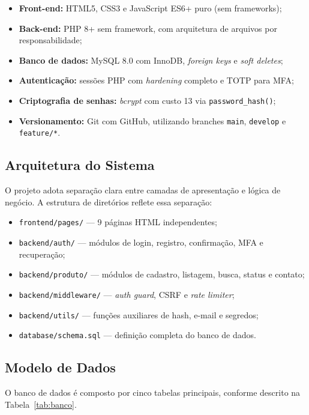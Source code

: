 \documentclass[12pt,a4paper]{article}
\begin{document}
\begin{itemize}
  \item \textbf{Front-end:} HTML5, CSS3 e JavaScript ES6+ puro (sem frameworks);
  \item \textbf{Back-end:} PHP 8+ sem framework, com arquitetura de arquivos por responsabilidade;
  \item \textbf{Banco de dados:} MySQL 8.0 com InnoDB, \textit{foreign keys} e \textit{soft deletes};
  \item \textbf{Autenticação:} sessões PHP com \textit{hardening} completo e TOTP para MFA;
  \item \textbf{Criptografia de senhas:} \textit{bcrypt} com custo 13 via \texttt{password\_hash()};
  \item \textbf{Versionamento:} Git com GitHub, utilizando branches \texttt{main}, \texttt{develop} e \texttt{feature/*}.
\end{itemize}

\subsection{Arquitetura do Sistema}

O projeto adota separação clara entre camadas de apresentação e lógica de negócio. A estrutura de diretórios reflete essa separação:

\begin{itemize}
  \item \texttt{frontend/pages/} — 9 páginas HTML independentes;
  \item \texttt{backend/auth/} — módulos de login, registro, confirmação, MFA e recuperação;
  \item \texttt{backend/produto/} — módulos de cadastro, listagem, busca, status e contato;
  \item \texttt{backend/middleware/} — \textit{auth guard}, CSRF e \textit{rate limiter};
  \item \texttt{backend/utils/} — funções auxiliares de hash, e-mail e segredos;
  \item \texttt{database/schema.sql} — definição completa do banco de dados.
\end{itemize}

\subsection{Modelo de Dados}

O banco de dados é composto por cinco tabelas principais, conforme descrito na Tabela~\ref{tab:banco}.
\end{document}
